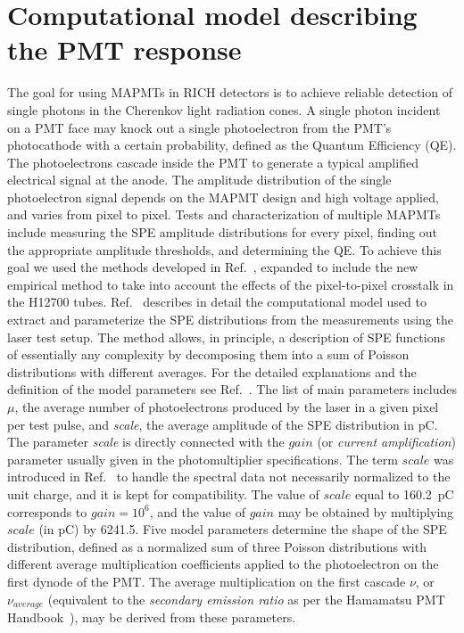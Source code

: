 \section{Computational model describing the PMT response}

The goal for using MAPMTs in RICH detectors is to achieve reliable detection of single photons in the Cherenkov light radiation cones. A single photon incident on a PMT face may knock out a single photoelectron from the PMT's photocathode with a certain probability, defined as the Quantum Efficiency (QE). The photoelectrons cascade inside the PMT to generate a typical amplified electrical signal at the anode. The amplitude distribution of the single photoelectron signal depends on the MAPMT design and high voltage applied, and varies from pixel to pixel. Tests and characterization of multiple MAPMTs include measuring the SPE amplitude distributions for every pixel, finding out the appropriate amplitude thresholds, and determining the QE. To achieve this goal we used the methods developed in Ref.~\cite{DEGTIARENKO20171}, expanded to include the new empirical method to take into account the effects of the pixel-to-pixel crosstalk in the H12700 tubes. Ref.~\cite{DEGTIARENKO20171} describes in detail the computational model used to extract and parameterize the SPE distributions from the measurements using the laser test setup. The method allows, in principle, a description of SPE functions of essentially any complexity by decomposing them into a sum of Poisson distributions with different averages. For the detailed explanations and the definition of the model parameters see Ref.~\cite{DEGTIARENKO20171}. The list of main parameters includes $\mu$, the average number of photoelectrons produced by the laser in a given pixel per test pulse, and {\it{scale}}, the average amplitude of the SPE distribution in pC. 
The parameter {\it{scale}} is directly connected with the $gain$ (or {\it{current amplification}}) parameter usually given in the photomultiplier specifications. The term $scale$ was introduced in Ref.~\cite{DEGTIARENKO20171} to handle the spectral data not necessarily normalized to the unit charge, and it is kept for compatibility. The value of $scale$ equal to 160.2~pC corresponds to $gain=10^6$, and the value of $gain$ may be obtained by multiplying $scale$ (in pC) by 6241.5.
Five model parameters determine the shape of the SPE distribution, defined as a normalized sum of three Poisson distributions with different average multiplication coefficients  applied to the photoelectron on the first dynode of the PMT. The average multiplication on the first cascade ${\nu}$, or ${\nu_{average}}$ (equivalent to the {\it secondary emission ratio} as per the Hamamatsu PMT Handbook~\cite{Hamamatsu4thedition}), may be derived from these parameters. 
